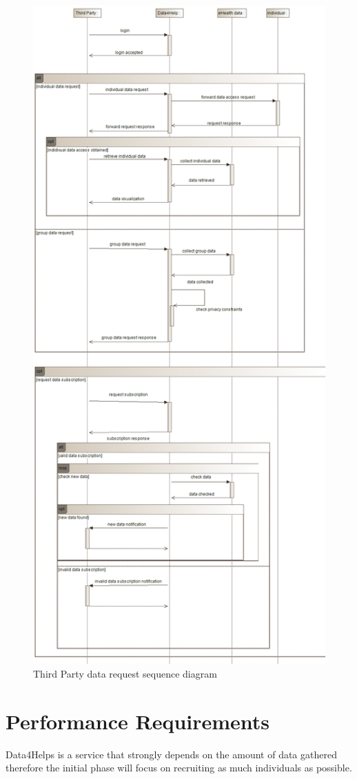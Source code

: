 \begin{figure}[H]
  \includegraphics[width=0.70\linewidth]{resources/UML/ThirdPartyDataRequest.png}
  \caption{Third Party data request sequence diagram}
  \label{fig: ThirdParty sequence diagram}
\end{figure}




\section{Performance Requirements}
Data4Helps is a service that strongly depends on the amount of data gathered therefore the initial phase will focus on recruiting as much individuals as possible.

